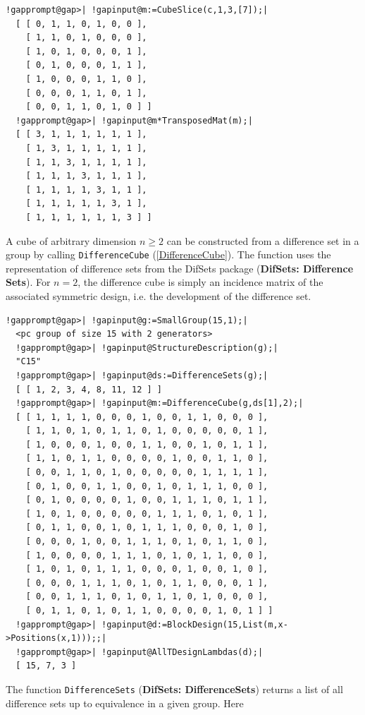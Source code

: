 \documentclass[a4paper,11pt]{report}
\begin{document}
{{\begin{Verbatim}[commandchars=!@|,fontsize=\small,frame=single,label=Example]
  !gapprompt@gap>| !gapinput@m:=CubeSlice(c,1,3,[7]);|
  [ [ 0, 1, 1, 0, 1, 0, 0 ], 
    [ 1, 1, 0, 1, 0, 0, 0 ], 
    [ 1, 0, 1, 0, 0, 0, 1 ], 
    [ 0, 1, 0, 0, 0, 1, 1 ], 
    [ 1, 0, 0, 0, 1, 1, 0 ], 
    [ 0, 0, 0, 1, 1, 0, 1 ], 
    [ 0, 0, 1, 1, 0, 1, 0 ] ]
  !gapprompt@gap>| !gapinput@m*TransposedMat(m);|
  [ [ 3, 1, 1, 1, 1, 1, 1 ], 
    [ 1, 3, 1, 1, 1, 1, 1 ], 
    [ 1, 1, 3, 1, 1, 1, 1 ], 
    [ 1, 1, 1, 3, 1, 1, 1 ], 
    [ 1, 1, 1, 1, 3, 1, 1 ], 
    [ 1, 1, 1, 1, 1, 3, 1 ], 
    [ 1, 1, 1, 1, 1, 1, 3 ] ]
\end{Verbatim}
 A cube of arbitrary dimension $n\ge 2$ can be constructed from a difference set in a group by calling \texttt{DifferenceCube} (\ref{DifferenceCube}). The function uses the representation of difference sets from the \textsf{DifSets} package  (\textbf{DifSets: Difference Sets}). For $n=2$, the difference cube is simply an incidence matrix of the associated
symmetric design, i.e. the development of the difference set. 
\begin{Verbatim}[commandchars=!@|,fontsize=\small,frame=single,label=Example]
  !gapprompt@gap>| !gapinput@g:=SmallGroup(15,1);|
  <pc group of size 15 with 2 generators>
  !gapprompt@gap>| !gapinput@StructureDescription(g);|
  "C15"
  !gapprompt@gap>| !gapinput@ds:=DifferenceSets(g);|
  [ [ 1, 2, 3, 4, 8, 11, 12 ] ]
  !gapprompt@gap>| !gapinput@m:=DifferenceCube(g,ds[1],2);|
  [ [ 1, 1, 1, 1, 0, 0, 0, 1, 0, 0, 1, 1, 0, 0, 0 ], 
    [ 1, 1, 0, 1, 0, 1, 1, 0, 1, 0, 0, 0, 0, 0, 1 ], 
    [ 1, 0, 0, 0, 1, 0, 0, 1, 1, 0, 0, 1, 0, 1, 1 ], 
    [ 1, 1, 0, 1, 1, 0, 0, 0, 0, 1, 0, 0, 1, 1, 0 ], 
    [ 0, 0, 1, 1, 0, 1, 0, 0, 0, 0, 0, 1, 1, 1, 1 ], 
    [ 0, 1, 0, 0, 1, 1, 0, 0, 1, 0, 1, 1, 1, 0, 0 ], 
    [ 0, 1, 0, 0, 0, 0, 1, 0, 0, 1, 1, 1, 0, 1, 1 ], 
    [ 1, 0, 1, 0, 0, 0, 0, 0, 1, 1, 1, 0, 1, 0, 1 ], 
    [ 0, 1, 1, 0, 0, 1, 0, 1, 1, 1, 0, 0, 0, 1, 0 ], 
    [ 0, 0, 0, 1, 0, 0, 1, 1, 1, 0, 1, 0, 1, 1, 0 ], 
    [ 1, 0, 0, 0, 0, 1, 1, 1, 0, 1, 0, 1, 1, 0, 0 ], 
    [ 1, 0, 1, 0, 1, 1, 1, 0, 0, 0, 1, 0, 0, 1, 0 ], 
    [ 0, 0, 0, 1, 1, 1, 0, 1, 0, 1, 1, 0, 0, 0, 1 ], 
    [ 0, 0, 1, 1, 1, 0, 1, 0, 1, 1, 0, 1, 0, 0, 0 ], 
    [ 0, 1, 1, 0, 1, 0, 1, 1, 0, 0, 0, 0, 1, 0, 1 ] ]
  !gapprompt@gap>| !gapinput@d:=BlockDesign(15,List(m,x->Positions(x,1)));;|
  !gapprompt@gap>| !gapinput@AllTDesignLambdas(d);|
  [ 15, 7, 3 ]
\end{Verbatim}
 The function \texttt{DifferenceSets} (\textbf{DifSets: DifferenceSets}) returns a list of all difference sets up to equivalence in a given group. Here
}}
\end{document}
